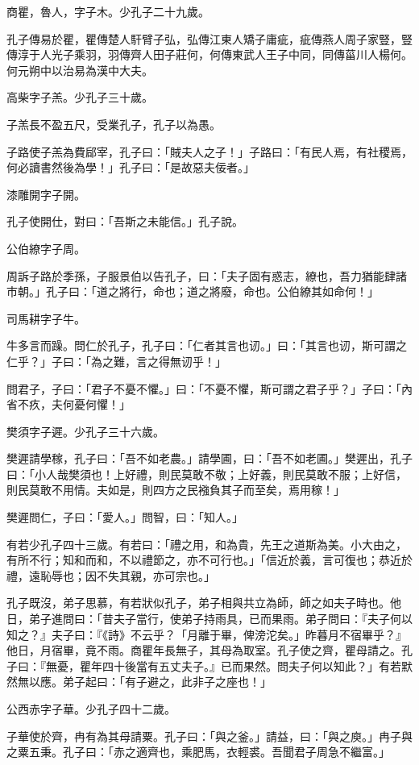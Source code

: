 \begin{pinyinscope}
商瞿，魯人，字子木。少孔子二十九歲。

孔子傳易於瞿，瞿傳楚人馯臂子弘，弘傳江東人矯子庸疵，疵傳燕人周子家豎，豎傳淳于人光子乘羽，羽傳齊人田子莊何，何傳東武人王子中同，同傳菑川人楊何。何元朔中以治易為漢中大夫。

高柴字子羔。少孔子三十歲。

子羔長不盈五尺，受業孔子，孔子以為愚。

子路使子羔為費郈宰，孔子曰：「賊夫人之子！」子路曰：「有民人焉，有社稷焉，何必讀書然後為學！」孔子曰：「是故惡夫佞者。」

漆雕開字子開。

孔子使開仕，對曰：「吾斯之未能信。」孔子說。

公伯繚字子周。

周訴子路於季孫，子服景伯以告孔子，曰：「夫子固有惑志，繚也，吾力猶能肆諸市朝。」孔子曰：「道之將行，命也；道之將廢，命也。公伯繚其如命何！」

司馬耕字子牛。

牛多言而躁。問仁於孔子，孔子曰：「仁者其言也讱。」曰：「其言也讱，斯可謂之仁乎？」子曰：「為之難，言之得無讱乎！」

問君子，子曰：「君子不憂不懼。」曰：「不憂不懼，斯可謂之君子乎？」子曰：「內省不疚，夫何憂何懼！」

樊須字子遲。少孔子三十六歲。

樊遲請學稼，孔子曰：「吾不如老農。」請學圃，曰：「吾不如老圃。」樊遲出，孔子曰：「小人哉樊須也！上好禮，則民莫敢不敬；上好義，則民莫敢不服；上好信，則民莫敢不用情。夫如是，則四方之民襁負其子而至矣，焉用稼！」

樊遲問仁，子曰：「愛人。」問智，曰：「知人。」

有若少孔子四十三歲。有若曰：「禮之用，和為貴，先王之道斯為美。小大由之，有所不行；知和而和，不以禮節之，亦不可行也。」「信近於義，言可復也；恭近於禮，遠恥辱也；因不失其親，亦可宗也。」

孔子既沒，弟子思慕，有若狀似孔子，弟子相與共立為師，師之如夫子時也。他日，弟子進問曰：「昔夫子當行，使弟子持雨具，已而果雨。弟子問曰：『夫子何以知之？』夫子曰：『《詩》不云乎？「月離于畢，俾滂沱矣。」昨暮月不宿畢乎？』他日，月宿畢，竟不雨。商瞿年長無子，其母為取室。孔子使之齊，瞿母請之。孔子曰：『無憂，瞿年四十後當有五丈夫子。』已而果然。問夫子何以知此？」有若默然無以應。弟子起曰：「有子避之，此非子之座也！」

公西赤字子華。少孔子四十二歲。

子華使於齊，冉有為其母請粟。孔子曰：「與之釜。」請益，曰：「與之庾。」冉子與之粟五秉。孔子曰：「赤之適齊也，乘肥馬，衣輕裘。吾聞君子周急不繼富。」


\end{pinyinscope}
